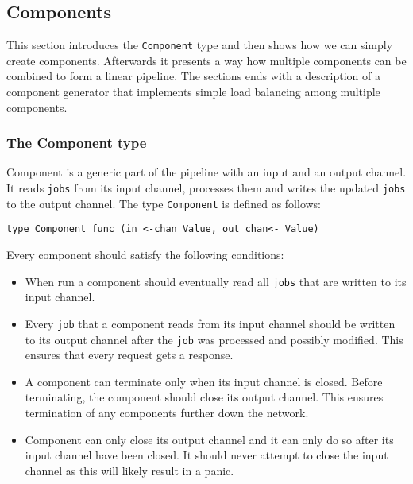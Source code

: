 \subsection{Components}
This section introduces the \texttt{Component} type and then shows how we can simply
create components. Afterwards it presents a way how multiple components can
be combined to form a linear pipeline. The sections ends with a description
of a component generator that implements simple load balancing among
multiple components.

\subsubsection{The Component type}
Component is a generic part of the pipeline with an input and 
an output channel. It reads \texttt{jobs} from its input channel, 
processes them and writes the updated \texttt{jobs} to the output 
channel. The type \texttt{Component} is defined as follows:
\begin{lstlisting}
type Component func (in <-chan Value, out chan<- Value)
\end{lstlisting}
Every component should satisfy the following conditions:
\begin{itemize}
    \item When run a component should eventually read all \texttt{jobs} that are
          written to its input channel.

    \item Every \texttt{job} that a component reads from its input channel
          should be written to its output channel after the \texttt{job} was processed
          and possibly modified. This ensures that every request gets a response.

    \item A component can terminate only when its input channel is closed. 
          Before terminating, the component should close its output channel.
          This ensures termination of any components further down the network.

    \item Component can only close its output channel and it can only do so
    	  after its input channel have been closed. It should never attempt
          to close the input channel as this will likely result in a panic.
\end{itemize}

